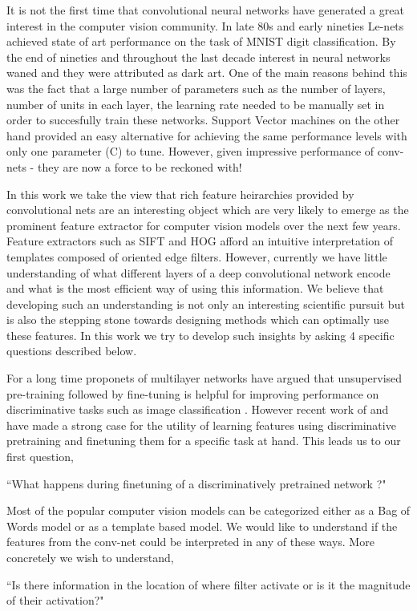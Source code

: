 \documentclass[runningheads]{llncs}
\begin{document}
It is not the first time that convolutional neural networks have generated a great interest in the computer vision community. In late 80s and early nineties Le-nets \cite{Lecun89} achieved state of art performance on the task of MNIST digit classification. By the end of nineties and throughout the last decade interest in neural networks waned and they were attributed as dark art. One of the main reasons behind this was the fact that a large number of parameters such as the number of layers, number of units in each layer, the learning rate needed to be manually set in order to succesfully train these networks. Support Vector machines on the other hand provided an easy alternative for achieving the same performance levels with only one parameter (C) to tune. However, given impressive performance of conv-nets - they are now a force to be reckoned with! 

In this work we take the view that rich feature heirarchies provided by convolutional nets are an interesting object which are very likely to emerge as the prominent feature extractor for computer vision models over the next few years. Feature extractors such as SIFT and HOG afford an intuitive interpretation of templates composed of oriented edge filters. However, currently we have little understanding of what different layers of a deep convolutional network encode and what is the most efficient way of using this information. We believe that developing such an understanding is not only an interesting scientific pursuit but is also the stepping stone towards designing methods which can optimally use these features.  In this work we try to develop such insights by asking 4 specific questions described below.

For a long time proponets of multilayer networks have argued that unsupervised pre-training followed by fine-tuning is helpful for improving performance on discriminative tasks such as image classification \cite{GoogleCat} \cite{DeepPre} \cite{HintonPre}. However recent work of \cite{Decaf} and \cite{Rcnn} have made a strong case for the utility of learning features using discriminative pretraining and finetuning them for a specific task at hand. This leads us to our first question,
\begin{center}
``What happens during finetuning of a discriminatively pretrained network ?"
\end{center}
Most of the popular computer vision models can be categorized either as a Bag of Words model or as a template based model. We would like to understand if the features from the conv-net could be interpreted in any of these ways. More concretely we wish to understand, 
\begin{center}
``Is there information in the location of where filter activate or is it the magnitude of their activation?" 
\end{center}
\end{document}
